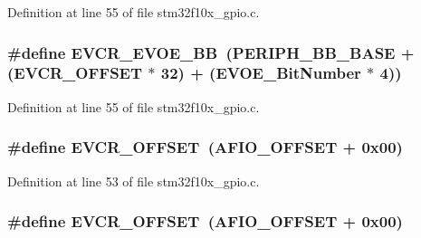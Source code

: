 Definition at line 55 of file stm32f10x\+\_\+gpio.\+c.

\subsubsection[{\texorpdfstring{E\+V\+C\+R\+\_\+\+E\+V\+O\+E\+\_\+\+BB}{EVCR_EVOE_BB}}]{\setlength{\rightskip}{0pt plus 5cm}\#define E\+V\+C\+R\+\_\+\+E\+V\+O\+E\+\_\+\+BB~({\bf P\+E\+R\+I\+P\+H\+\_\+\+B\+B\+\_\+\+B\+A\+SE} + ({\bf E\+V\+C\+R\+\_\+\+O\+F\+F\+S\+ET} $\ast$ 32) + ({\bf E\+V\+O\+E\+\_\+\+Bit\+Number} $\ast$ 4))}\hypertarget{group___g_p_i_o___private___defines_ga6e4f8c4e3def38811ac6c03b4f64240b}{}\label{group___g_p_i_o___private___defines_ga6e4f8c4e3def38811ac6c03b4f64240b}


Definition at line 55 of file stm32f10x\+\_\+gpio.\+c.

\subsubsection[{\texorpdfstring{E\+V\+C\+R\+\_\+\+O\+F\+F\+S\+ET}{EVCR_OFFSET}}]{\setlength{\rightskip}{0pt plus 5cm}\#define E\+V\+C\+R\+\_\+\+O\+F\+F\+S\+ET~({\bf A\+F\+I\+O\+\_\+\+O\+F\+F\+S\+ET} + 0x00)}\hypertarget{group___g_p_i_o___private___defines_gaf8c24f39392c89142f1b97a418669d5d}{}\label{group___g_p_i_o___private___defines_gaf8c24f39392c89142f1b97a418669d5d}


Definition at line 53 of file stm32f10x\+\_\+gpio.\+c.

\subsubsection[{\texorpdfstring{E\+V\+C\+R\+\_\+\+O\+F\+F\+S\+ET}{EVCR_OFFSET}}]{\setlength{\rightskip}{0pt plus 5cm}\#define E\+V\+C\+R\+\_\+\+O\+F\+F\+S\+ET~({\bf A\+F\+I\+O\+\_\+\+O\+F\+F\+S\+ET} + 0x00)}\hypertarget{group___g_p_i_o___private___defines_gaf8c24f39392c89142f1b97a418669d5d}{}\label{group___g_p_i_o___private___defines_gaf8c24f39392c89142f1b97a418669d5d}


